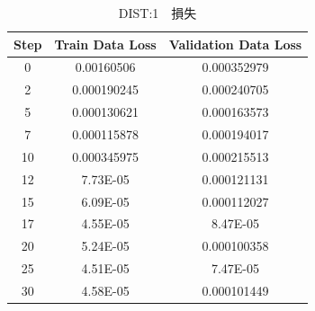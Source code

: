 \documentclass{jreport}		%
\begin{document}
\begin{table}
  \begin{center}
  \caption{DIST:1　損失}
  \begin{tabular}{c|cc} \hline
Step&Train Data Loss&Validation Data Loss \\ \hline
0&0.00160506&0.000352979 \\
2&0.000190245&0.000240705 \\
5&0.000130621&0.000163573 \\
7&0.000115878&0.000194017 \\
10&0.000345975&0.000215513 \\
12&7.73E-05&0.000121131 \\
15&6.09E-05&0.000112027 \\
17&4.55E-05&8.47E-05 \\
20&5.24E-05&0.000100358 \\
25&4.51E-05&7.47E-05 \\
30&4.58E-05&0.000101449 \\

\end{tabular}
\end{center}
\end{table}
\end{document}
